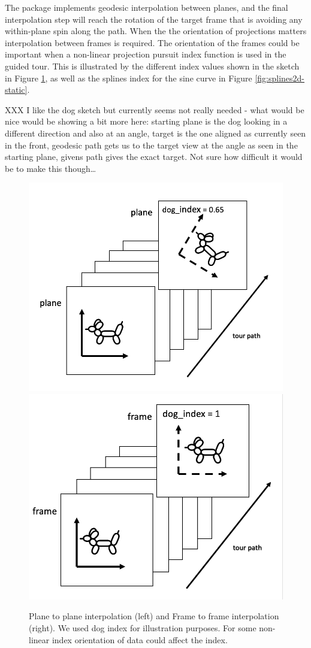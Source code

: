 The  package implements geodesic interpolation between planes, and the final interpolation step will reach the rotation of the target frame that is avoiding any within-plane spin along the path. When the the orientation of projections matters interpolation between frames is required. The orientation of the frames could be important when a non-linear projection pursuit index function is used in the guided tour. This is illustrated by the different index values shown in the sketch in Figure \ref{fig:dogs}, as well as the splines index for the sine curve in Figure \ref{fig:splines2d-static}.

XXX I like the dog sketch but currently seems not really needed - what would be nice would be showing a bit more here: starting plane is the dog looking in a different direction and also at an angle, target is the one aligned as currently seen in the front, geodesic path gets us to the target view at the angle as seen in the starting plane, givens path gives the exact target. Not sure how difficult it would be to make this though\ldots{}

\begin{figure}

{\centering \includegraphics[width=0.45\linewidth]{plane} \includegraphics[width=0.45\linewidth]{frame} 

}

\caption{Plane to plane interpolation (left) and Frame to frame interpolation (right). We used dog index for illustration purposes. For some non-linear index orientation of data could affect the index.}\label{fig:dogs}
\end{figure}

